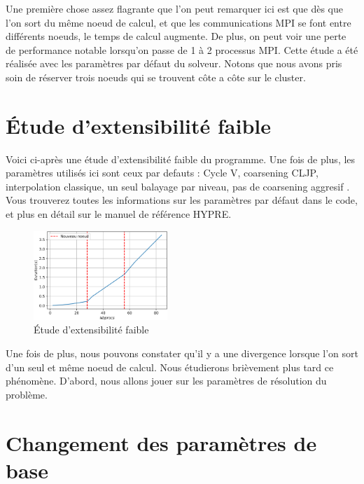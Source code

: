 \documentclass[10pt,twocolumn,letterpaper]{article}
\begin{document}
Une première chose assez flagrante que l'on peut remarquer ici est que dès que
l'on sort du même noeud de calcul, et que les communications MPI se font entre
différents noeuds, le temps de calcul augmente.
De plus, on peut voir une perte de performance notable lorsqu'on passe de 1 à 2
processus MPI. Cette étude a été réalisée avec les paramètres par défaut du
solveur.
Notons que nous avons pris soin de
réserver trois noeuds qui se trouvent côte a côte sur le cluster.

\section{Étude d'extensibilité faible}

Voici ci-après une étude d'extensibilité faible du programme. Une fois de plus,
les paramètres utilisés ici sont ceux par defauts : Cycle V, coarsening CLJP,
interpolation classique, un seul balayage par niveau, pas de coarsening aggresif
. Vous trouverez toutes les informations sur les paramètres par défaut dans le
code, et plus en détail sur le manuel de référence HYPRE.

\begin{figure}[H]
    \centering
    \caption{Étude d'extensibilité faible}
    \includegraphics[width=0.45\textwidth]{fig/weak_scalab.png}
  \end{figure}

Une fois de plus, nous pouvons constater qu'il y a une divergence lorsque l'on
sort d'un seul et même noeud de calcul. Nous étudierons brièvement plus tard
ce phénomène. 
D'abord, nous allons jouer sur les paramètres de résolution du problème.


\section{Changement des paramètres de base}
\end{document}
